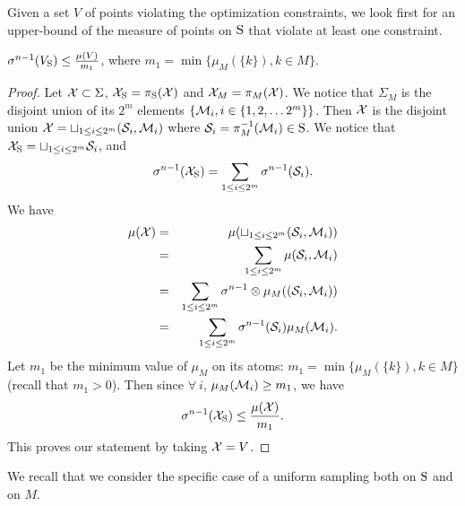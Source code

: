 Given a set $V$ of points violating the optimization constraints, we look first for an upper-bound of the measure of points on $\text{S}$ that violate at least one constraint.

\begin{lemma}$\sigma^{n-1}(V_{\text{S}}) \leq \frac{\mu(V)}{m_1}$, where $m_1 = \min \{\mu_M(\{k\}), k \in M\}$.\end{lemma}
\begin{proof}

Let $\mathcal{X} \subset \Sigma$, $\mathcal{X}_{\text{S}} = \pi_{\text{S}} (\mathcal{X})$ and $\mathcal{X}_M = \pi_M (\mathcal{X})$. We notice that $\Sigma_M$ is the disjoint union of its $2^m$ elements $\{\mathcal{M}_i, i \in \{1,2, \ldots 2^m\} \}$. Then $\mathcal{X}$ is the disjoint union $\mathcal{X} = \sqcup_{1 \leq i \leq 2^m} (\mathcal{S}_i, \mathcal{M}_i)$ where $\mathcal{S}_i = \pi_M^{-1} (\mathcal{M}_i) \in \text{S}$. We notice that 
$\mathcal{X}_{\text{S}} = \sqcup_{1 \leq i \leq 2^m} \mathcal{S}_i$, 
and
\begin{equation*}
\sigma^{n-1} (\mathcal{X}_{\text{S}}) = \sum_{1 \leq i \leq 2^m} \sigma^{n-1} (\mathcal{S}_i).
\end{equation*}
We have 
\begin{eqnarray*}
\mu(\mathcal{X}) &=& \mu(\sqcup_{1 \leq i \leq 2^m} (\mathcal{S}_i, \mathcal{M}_i)) \\
&=& \sum_{1 \leq i \leq 2^m} \mu(\mathcal{S}_i, \mathcal{M}_i) \\
 &=& \sum_{1 \leq i \leq 2^m} \sigma^{n-1} \otimes \mu_M ((\mathcal{S}_i, \mathcal{M}_i)) \\
 & = &\sum_{1 \leq i \leq 2^m} \sigma^{n-1}(\mathcal{S}_i) \mu_M (\mathcal{M}_i).
\end{eqnarray*}
Let $m_1$ be the minimum value  of $\mu_M$ on its atoms: $m_1 = \min \{\mu_M(\{k\}), k \in M\}$ (recall that $m_1 > 0$). Then since $ \forall \ i$, $\mu_M(\mathcal{M}_i) \geq m_1$, we have
\begin{equation}
\sigma^{n-1}(\mathcal{X}_{\text{S}}) \leq \frac{\mu(\mathcal{X})}{m_1}.
\end{equation}
This proves our statement by taking $\mathcal{X} = V$.
\end{proof}

We recall that we consider the specific case of a uniform sampling both on $\text{S}$ and on $M$. 

